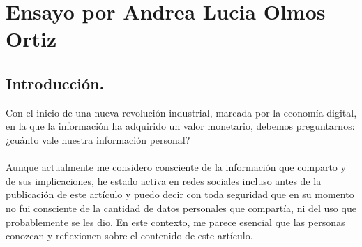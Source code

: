 \section*{Ensayo por Andrea Lucia Olmos Ortiz}
\subsection*{Introducción.}
Con el inicio de una nueva revolución industrial, marcada por la economía digital, en la que la información ha adquirido un valor monetario, debemos preguntarnos: ¿cuánto vale nuestra información personal?\\ \\
Aunque actualmente me considero consciente de la información que comparto y de sus implicaciones, he estado activa en redes sociales incluso antes de la publicación de este artículo y puedo decir con toda seguridad que en su momento no fui consciente de la cantidad de datos personales que compartía, ni del uso que probablemente se les dio. En este contexto, me parece esencial que las personas conozcan y reflexionen sobre el contenido de este artículo.\\ \\
